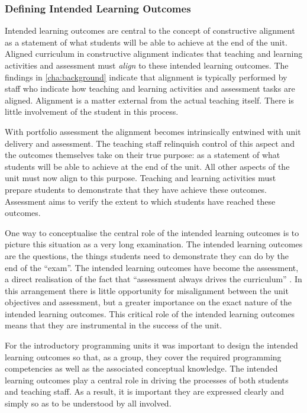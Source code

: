 \subsubsection{Defining Intended Learning Outcomes} %
\label{sub:defining_intended_learning_outcomes}

Intended learning outcomes are central to the concept of constructive alignment as a statement of what students will be able to achieve at the end of the unit. Aligned curriculum in constructive alignment indicates that teaching and learning activities and assessment must \emph{align} to these intended learning outcomes. The findings in \cref{cha:background} indicate that alignment is typically performed by staff who indicate how teaching and learning activities and assessment tasks are aligned. Alignment is a matter external from the actual teaching itself. There is little involvement of the student in this process.

With portfolio assessment the alignment becomes intrinsically entwined with unit delivery and assessment. The teaching staff relinquish control of this aspect and the outcomes themselves take on their true purpose: as a statement of what students will be able to achieve at the end of the unit. All other aspects of the unit must now align to this purpose. Teaching and learning activities must prepare students to demonstrate that they have achieve these outcomes. Assessment aims to verify the extent to which students have reached these outcomes.

One way to conceptualise the central role of the intended learning outcomes is to picture this situation as a very long examination. The intended learning outcomes are the questions, the things students need to demonstrate they can do by the end of the ``exam''. The intended learning outcomes have become the assessment, a direct realisation of the fact that ``assessment always drives the curriculum'' \cite{Ramsden:2003}.  In this arrangement there is little opportunity for misalignment between the unit objectives and assessment, but a greater importance on the exact nature of the intended learning outcomes. This critical role of the intended learning outcomes means that they are instrumental in the success of the unit. 

For the introductory programming units it was important to design the intended learning outcomes so that, as a group, they cover the required programming competencies as well as the associated conceptual knowledge. The intended learning outcomes play a central role in driving the processes of both students and teaching staff. As a result, it is important they are expressed clearly and simply so as to be understood by all involved.


